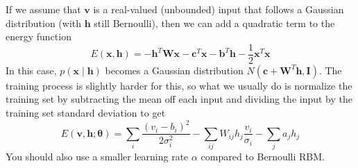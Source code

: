     \begin{definition} 
      If we assume that $\mathbf{v}$ is a real-valued (unbounded) input that follows a Gaussian distribution (with $\mathbf{h}$ still Bernoulli), then we can add a quadratic term to the energy function 
      \begin{equation} 
        E(\mathbf{x}, \mathbf{h}) = - \mathbf{h}^T \mathbf{W} \mathbf{x} - \mathbf{c}^T \mathbf{x} - \mathbf{b}^T \mathbf{h} - \frac{1}{2} \mathbf{x}^T \mathbf{x}
      \end{equation}
      In this case, $p(\mathbf{x} \mid \mathbf{h})$ becomes a Gaussian distribution $N(\mathbf{c} + \mathbf{W}^T \mathbf{h}, \mathbf{I})$. The training process is slightly harder for this, so what we usually do is normalize the training set by subtracting the mean off each input and dividing the input by the training set standard deviation to get  
      \begin{equation} 
        E(\mathbf{v}, \mathbf{h}; \boldsymbol{\theta}) = \sum_i \frac{(v_i - b_i)^2}{2 \sigma_i^2} - \sum_{ij} W_{ij} h_j \frac{v_i}{\sigma_i} - \sum_j a_j h_j
      \end{equation}
      You should also use a smaller learning rate $\alpha$ compared to Bernoulli RBM. 
    \end{definition} 

